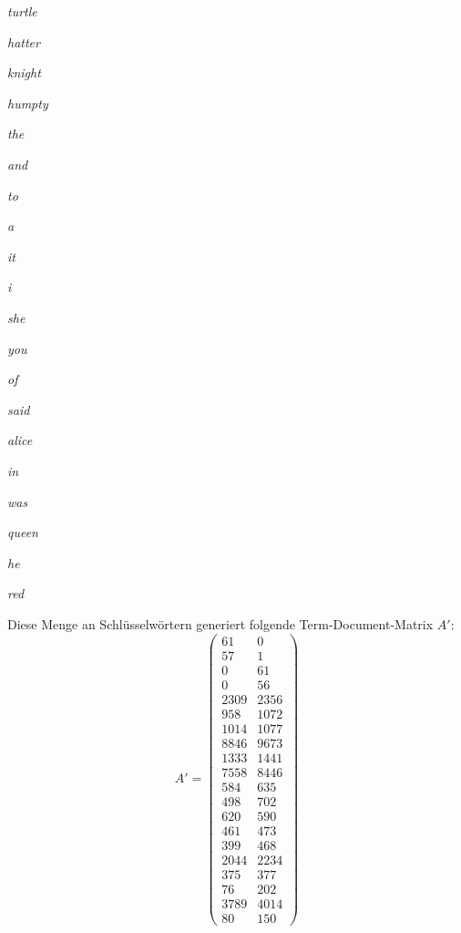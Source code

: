 \documentclass{article}
\begin{document}
\begin{center}
\begin{minipage}{.45\textwidth}
\begin{enumerate}
\begin{minipage}{0.35\linewidth}
    \item \textit{turtle}
    \item \textit{hatter}
    \item \textit{knight}
    \item \textit{humpty}
    \item \textit{the}
    \item \textit{and}
    \item \textit{to}
    \item \textit{a}
    \item \textit{it}
    \item \textit{i}
\end{minipage}
\begin{minipage}{0.35\linewidth}
    \item \textit{she}
    \item \textit{you}
    \item \textit{of}
    \item \textit{said}
    \item \textit{alice}
    \item \textit{in}
    \item \textit{was}
    \item \textit{queen}
    \item \textit{he}
    \item \textit{red}
\end{minipage}
\end{enumerate}
\end{minipage}
\end{center}
Diese Menge an Schlüsselwörtern generiert folgende Term-Document-Matrix $A'$:
$$A'=\begin{pmatrix}
61 & 0\\
57 & 1\\
0 & 61\\
0 & 56\\
2309 & 2356\\
958 & 1072\\
1014 & 1077\\
8846 & 9673\\
1333 & 1441\\
7558 & 8446\\
584 & 635\\
498 & 702\\
620 & 590\\
461 & 473\\
399 & 468\\
2044 & 2234\\
375 & 377\\
76 & 202\\
3789 & 4014\\
80 & 150
\end{pmatrix}$$
\end{document}
